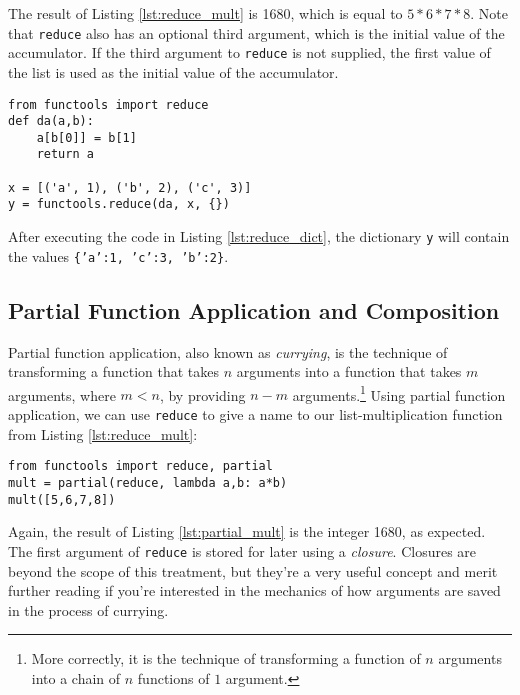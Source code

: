 \documentclass{article}\usepackage{beamerarticle}
\begin{document}
\noindent The result of Listing \ref{lst:reduce_mult} is 1680, which is equal to $5 * 6 * 7 * 8$. Note that \texttt{reduce} also has an optional third argument, which is the initial value of the accumulator. If the third argument to \texttt{reduce} is not supplied, the first value of the list is used as the initial value of the accumulator.

\begin{frame}[fragile]
\begin{lstlisting}[style=python,caption={Convert to Dictionary},label={lst:reduce_dict}]
from functools import reduce
def da(a,b):
    a[b[0]] = b[1]
    return a

x = [('a', 1), ('b', 2), ('c', 3)]
y = functools.reduce(da, x, {})
\end{lstlisting}
\end{frame}

\noindent After executing the code in Listing \ref{lst:reduce_dict}, the dictionary \texttt{y} will contain the values \texttt{\{'a':1, 'c':3, 'b':2\}}.

\subsection{Partial Function Application and Composition}
Partial function application, also known as \textit{currying}, is the technique of transforming a function that takes $n$ arguments into a function that takes $m$ arguments, where $m < n$, by providing $n-m$ arguments.\footnote{More correctly, it is the technique of transforming a function of $n$ arguments into a chain of $n$ functions of $1$ argument.} Using partial function application, we can use \texttt{reduce} to give a name to our list-multiplication function from Listing \ref{lst:reduce_mult}:

\begin{frame}[fragile]
\begin{lstlisting}[style=python,caption={List Multiplication},label={lst:partial_mult}]
from functools import reduce, partial
mult = partial(reduce, lambda a,b: a*b)
mult([5,6,7,8])
\end{lstlisting}
\end{frame}

\noindent Again, the result of Listing \ref{lst:partial_mult} is the integer 1680, as expected. The first argument of \texttt{reduce} is stored for later using a \textit{closure}. Closures are beyond the scope of this treatment, but they're a very useful concept and merit further reading if you're interested in the mechanics of how arguments are saved in the process of currying.
\end{document}
